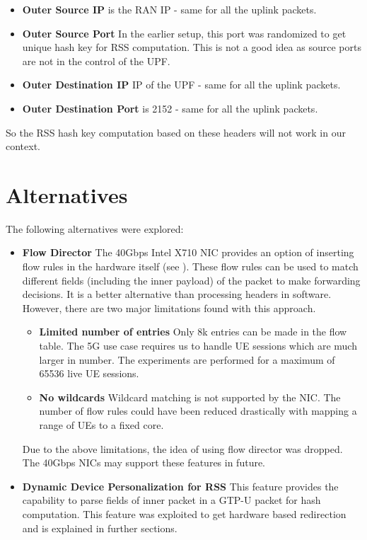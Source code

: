 \begin{itemize}
\item \textbf{Outer Source IP} is the RAN IP - same for all the uplink packets.
\item \textbf{Outer Source Port} In the earlier setup, this port was randomized to  get unique hash key for RSS computation. This is not a good idea as source ports are not in the control of the UPF. 
\item \textbf{Outer Destination IP} IP of the UPF - same for all the uplink packets.
\item \textbf{Outer Destination Port} is 2152 - same for all the uplink packets.
\end{itemize}
So the RSS hash key computation based on these headers will not work in our context.

\section{Alternatives \label{sectionAlternativesDDP}}
The following alternatives were explored:
\begin{itemize}
\item \textbf{Flow Director}
The 40Gbps Intel X710 NIC provides an option of inserting flow rules in the hardware itself (see \cite{flowReport}). These flow rules can be used to match different fields (including the inner payload) of the packet to make forwarding decisions. It is a better alternative than processing headers in software. However, there are two major limitations found with this approach.
\begin{itemize}
\item \textbf{Limited number of entries} Only 8k entries can be made in the flow table. The 5G use case requires us to handle UE sessions which are much larger in number. The experiments are performed for a maximum of 65536 live UE sessions. 
\item \textbf{No wildcards} Wildcard matching is not supported by the NIC. The number of flow rules could have been reduced drastically with mapping a range of UEs to a fixed core.
\end{itemize}
Due to the above limitations, the idea of using flow director was dropped. The 40Gbps NICs may support these features in future.
\item \textbf{Dynamic Device Personalization for RSS} This feature provides  the capability to parse fields of inner packet in a GTP-U packet for hash computation. This feature was exploited to get hardware based redirection and is explained in further sections.
\end{itemize}

